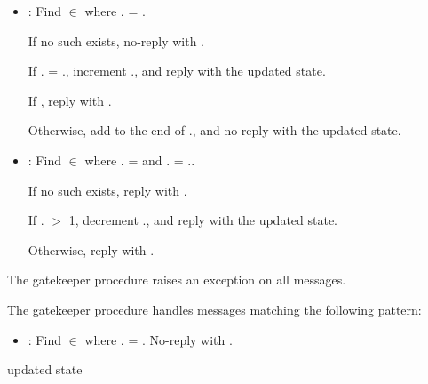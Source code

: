 \begin{itemize}
\item {}: Find  $\in$
   where . = .

  If no such  exists, no-reply with .

  If . = ., increment
  ., and reply  with the updated
  state.

  If , reply  with
  .

  Otherwise, add  to the end of .,
  and no-reply with the updated state.

\item {}: Find  $\in$
   where . =  and
  . = ..

  If no such  exists, reply  with .

  If . $>$ 1, decrement .,
  and reply  with the updated state.

  Otherwise, reply  with .
\end{itemize}

 The gatekeeper
 procedure raises an exception on all messages.

 The gatekeeper
 procedure handles messages matching the following
pattern:\antipar

\begin{itemize}
\item {}: Find  $\in$
   where . =
  . No-reply with .
\end{itemize}

\begin{procedure}
\end{procedure}
\returns{} updated state

